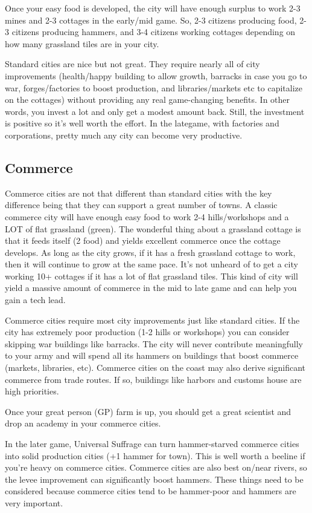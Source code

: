 \documentclass[10pt]{article}
\begin{document}
Once your easy food is developed, the city will have enough surplus to work 2-3
mines and 2-3 cottages in the early/mid game. So, 2-3 citizens producing food,
2-3 citizens producing hammers, and 3-4 citizens working cottages depending on
how many grassland tiles are in your city.

Standard cities are nice but not great. They require nearly all of city improvements
(health/happy building to allow growth, barracks in case you go to war, forges/factories to boost production,
and libraries/markets etc to capitalize on the cottages) without providing
any real game-changing benefits. In other words, you invest a lot and only get
a modest amount back. Still, the investment is positive so it's well worth the effort.
In the lategame, with factories and corporations, pretty much any city can become
very productive.

\subsection*{Commerce}

Commerce cities are not that different than standard cities with the key difference
being that they can support a great number of towns. A classic commerce city will
have enough easy food to work 2-4 hills/workshops and a LOT of flat grassland (green).
The wonderful thing about a grassland cottage is that it feeds itself (2 food) and
yields excellent commerce once the cottage develops. As long as the city grows, if it
has a fresh grassland cottage to work, then it will continue to grow at the same pace.
It's not unheard of to get a city working 10+ cottages if it has a lot of flat grassland
tiles. This kind of city will yield a massive amount of commerce in the mid to late game
and can help you gain a tech lead.

Commerce cities require most city improvements just like standard cities. If the city
has extremely poor production (1-2 hills or workshops) you can consider skipping war
buildings like barracks. The city will never contribute meaningfully to your army and
will spend all its hammers on buildings that boost commerce (markets, libraries, etc).
Commerce cities on the coast may also derive significant commerce from trade routes.
If so, buildings like harbors and customs house are high priorities.

Once your great person (GP) farm is up, you should get a great scientist and drop an
academy in your commerce cities.

In the later game, Universal Suffrage can turn hammer-starved commerce cities into
solid production cities (+1 hammer for town). This is well worth a beeline if you're
heavy on commerce cities. Commerce cities are also best on/near rivers, so the levee
improvement can significantly boost hammers. These things need to be considered because
commerce cities tend to be hammer-poor and hammers are very important.
\end{document}
